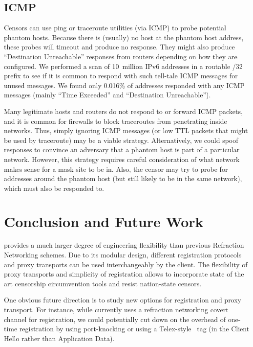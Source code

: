 \documentclass[sigconf]{acmart}
\begin{document}
\subsection{ICMP}
Censors can use ping or traceroute utilities (via ICMP) to probe potential phantom
hosts. Because there is (usually) no host at the phantom host address, these
probes will timeout and produce no response. They might also produce
``Destination Unreachable'' responses from routers depending on how they are
configured. We performed a scan of 10~million IPv6 addresses in a routable /32
prefix to see if it is common to respond with such tell-tale ICMP messages for
unused messages. We found only 0.016\% of addresses responded with any ICMP
messages (mainly ``Time Exceeded'' and ``Destination Unreachable'').

Many legitimate hosts and routers do not respond to or forward ICMP packets, and
it is common for firewalls to block traceroutes from penetrating inside
networks. Thus, simply ignoring ICMP messages (or low TTL packets that might be
used by traceroute) may be a viable strategy. %
Alternatively, we could spoof responses to convince an adversary that a 
phantom host is part of a particular network. However, this strategy requires careful
consideration of what network makes sense for a mask site to be in. Also, the
censor may try to probe for addresses around the phantom host (but still likely to
be in the same network), which must also be responded to.








\section{Conclusion and Future Work}

\scheme provides a much larger degree of engineering flexibility than previous
Refraction Networking schemes. Due to its modular design, different registration
protocols and proxy transports can be used interchangeably by the client. The
flexibility of proxy transports and simplicity of registration allows \scheme to
incorporate state of the art censorship circumvention tools and resist 
nation-state censors. 

One obvious future direction is to study new options for registration and proxy transport. For instance, while 
\scheme currently uses a refraction networking covert channel for registration, we could potentially 
cut down on the overhead of one-time registration by using port-knocking or using a 
Telex-style~\cite{telex11} tag (in the Client Hello rather than Application Data).
\end{document}
